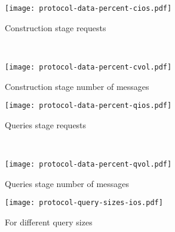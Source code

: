 \newlength{\hardcodedheighto}
\newlength{\askipo}
\newlength{\bskipo}
\newlength{\blskipo}

\setlength{\hardcodedheighto}{135pt}
\setlength{\askipo}{-10pt}
\setlength{\bskipo}{0pt}
\setlength{\blskipo}{-5pt}

\begin{figure*}[ht!]
	\captionsetup{justification=centering}
	\centering
	\begin{minipage}{0.66\textwidth}
		\captionsetup[subfigure]{justification=centering}
		\centering
		\begin{subfigure}[t]{0.5\textwidth}
			\centering
			\texttt{[image: protocol-data-percent-cios.pdf]}
			\setlength{\abovecaptionskip}{\askipo}
			\setlength{\belowcaptionskip}{\bskipo}
			\caption{Construction stage {\IO} requests}\label{figure:protocols-data-percent:cios}
		\end{subfigure}%
		~ %
		\begin{subfigure}[t]{0.5\textwidth}
			\centering
			\texttt{[image: protocol-data-percent-cvol.pdf]}
			\setlength{\abovecaptionskip}{\askipo}
			\setlength{\belowcaptionskip}{\bskipo}
			\caption{Construction stage number of messages}\label{figure:protocols-data-percent:cvol}
		\end{subfigure}%

		\begin{subfigure}[t]{0.5\textwidth}
			\centering
			\texttt{[image: protocol-data-percent-qios.pdf]}
			\setlength{\abovecaptionskip}{\askipo}
			\setlength{\belowcaptionskip}{\blskipo}
			\caption{Queries stage {\IO} requests}\label{figure:protocols-data-percent:qios}
		\end{subfigure}%
		~ %
		\begin{subfigure}[t]{0.5\textwidth}
			\centering
			\texttt{[image: protocol-data-percent-qvol.pdf]}
			\setlength{\abovecaptionskip}{\askipo}
			\setlength{\belowcaptionskip}{\blskipo}
			\caption{Queries stage number of messages}\label{figure:protocols-data-percent:qvol}
		\end{subfigure}%
		\caption{Protocol scalability}\label{figure:protocols-data-percent}
	\end{minipage}%
	\begin{minipage}{.33\textwidth}
		\captionsetup[subfigure]{justification=centering}
		\centering
		\begin{subfigure}[t]{\textwidth}
			\centering
			\setlength{\abovecaptionskip}{-0pt}
			\setlength{\belowcaptionskip}{\bskipo}
			\texttt{[image: protocol-query-sizes-ios.pdf]}
			\caption{For different query sizes}\label{figure:protocols-query-sizes}
		\end{subfigure}%


\end{minipage}
\end{figure*}
